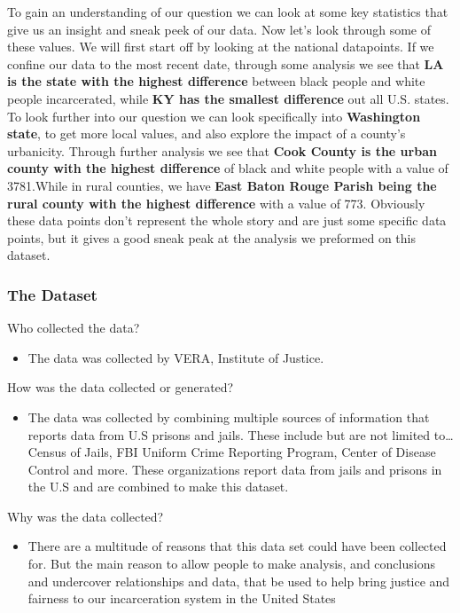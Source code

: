 \documentclass[
]{article}
\providecommand{\tightlist}{%
  \setlength{\itemsep}{0pt}\setlength{\parskip}{0pt}}
\begin{document}
To gain an understanding of our question we can look at some key
statistics that give us an insight and sneak peek of our data. Now let's
look through some of these values. We will first start off by looking at
the national datapoints. If we confine our data to the most recent date,
through some analysis we see that \textbf{LA is the state with the
highest difference} between black people and white people incarcerated,
while \textbf{KY has the smallest difference} out all U.S. states. To
look further into our question we can look specifically into
\textbf{Washington state}, to get more local values, and also explore
the impact of a county's urbanicity. Through further analysis we see
that \textbf{Cook County is the urban county with the highest
difference} of black and white people with a value of 3781.While in
rural counties, we have \textbf{East Baton Rouge Parish being the rural
county with the highest difference} with a value of 773. Obviously these
data points don't represent the whole story and are just some specific
data points, but it gives a good sneak peak at the analysis we preformed
on this dataset.

\hypertarget{the-dataset}{%
\subsubsection{The Dataset}\label{the-dataset}}

Who collected the data?

\begin{itemize}
\tightlist
\item
  The data was collected by VERA, Institute of Justice.
\end{itemize}

How was the data collected or generated?

\begin{itemize}
\tightlist
\item
  The data was collected by combining multiple sources of information
  that reports data from U.S prisons and jails. These include but are
  not limited to\ldots{} Census of Jails, FBI Uniform Crime Reporting
  Program, Center of Disease Control and more. These organizations
  report data from jails and prisons in the U.S and are combined to make
  this dataset.
\end{itemize}

Why was the data collected?

\begin{itemize}
\tightlist
\item
  There are a multitude of reasons that this data set could have been
  collected for. But the main reason to allow people to make analysis,
  and conclusions and undercover relationships and data, that be used to
  help bring justice and fairness to our incarceration system in the
  United States
\end{itemize}
\end{document}
